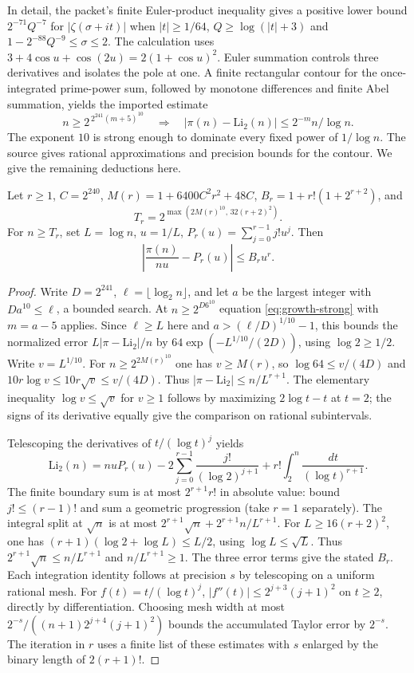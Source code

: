 In detail, the packet's finite Euler-product inequality gives a positive lower bound $2^{-71}Q^{-7}$ for $|\zeta(\sigma+it)|$ when $|t|\ge1/64$, $Q\ge\log(|t|+3)$ and $1-2^{-88}Q^{-9}\le\sigma\le2$. The calculation uses $3+4\cos u+\cos(2u)=2(1+\cos u)^2$. Euler summation controls three derivatives and isolates the pole at one. A finite rectangular contour for the once-integrated prime-power sum, followed by monotone differences and finite Abel summation, yields the imported estimate
\begin{equation}\label{eq:growth-strong}
 n\ge 2^{\,2^{241}(m+5)^{10}}
 \quad\Longrightarrow\quad
 |\pi(n)-\mathrm{Li}_2(n)|\le 2^{-m} n/\log n .
\end{equation}
The exponent $10$ is strong enough to dominate every fixed power of $1/\log n$. The source gives rational approximations and precision bounds for the contour. We give the remaining deductions here.

\begin{lemma}\label{lem:growthfactorial}
Let $r\ge1$, $C=2^{240}$, $M(r)=1+6400C^2r^2+48C$, $B_r=1+r!(1+2^{r+2})$, and
\[
 T_r=2^{\max(2M(r)^{10},\,32(r+2)^2)}.
\]
For $n\ge T_r$, set $L=\log n$, $u=1/L$, $P_r(u)=\sum_{j=0}^{r-1}j!u^j$. Then
\[
 \left|\frac{\pi(n)}{nu}-P_r(u)\right|\le B_r u^r.
\]
\end{lemma}
\begin{proof}
Write $D=2^{241}$, $\ell=\lfloor\log_2 n\rfloor$, and let $a$ be the largest integer with $D a^{10}\le\ell$, a bounded search. At $n\ge2^{D6^{10}}$ equation \eqref{eq:growth-strong} with $m=a-5$ applies. Since $\ell\ge L$ here and $a>(\ell/D)^{1/10}-1$, this bounds the normalized error $L|\pi-\mathrm{Li}_2|/n$ by $64\exp(-L^{1/10}/(2D))$, using $\log2\ge1/2$. Write $v=L^{1/10}$. For $n\ge2^{2M(r)^{10}}$ one has $v\ge M(r)$, so $\log64\le v/(4D)$ and $10r\log v\le10r\sqrt v\le v/(4D)$. Thus $|\pi-\mathrm{Li}_2|\le n/L^{r+1}$. The elementary inequality $\log v\le\sqrt v$ for $v\ge1$ follows by maximizing $2\log t-t$ at $t=2$; the signs of its derivative equally give the comparison on rational subintervals.

Telescoping the derivatives of $t/(\log t)^j$ yields
\[
 \mathrm{Li}_2(n)=nuP_r(u)
 -2\sum_{j=0}^{r-1}\frac{j!}{(\log2)^{j+1}}
 +r!\int_2^n\frac{dt}{(\log t)^{r+1}} .
\]
The finite boundary sum is at most $2^{r+1}r!$ in absolute value: bound $j!\le(r-1)!$ and sum a geometric progression (take $r=1$ separately). The integral split at $\sqrt n$ is at most $2^{r+1}\sqrt n+2^{r+1}n/L^{r+1}$. For $L\ge16(r+2)^2$, one has $(r+1)(\log2+\log L)\le L/2$, using $\log L\le\sqrt L$. Thus $2^{r+1}\sqrt n\le n/L^{r+1}$ and $n/L^{r+1}\ge1$. The three error terms give the stated $B_r$. Each integration identity follows at precision $s$ by telescoping on a uniform rational mesh. For $f(t)=t/(\log t)^j$, $|f''(t)|\le 2^{j+3}(j+1)^2$ on $t\ge2$, directly by differentiation. Choosing mesh width at most $2^{-s}/((n+1)2^{j+4}(j+1)^2)$ bounds the accumulated Taylor error by $2^{-s}$. The iteration in $r$ uses a finite list of these estimates with $s$ enlarged by the binary length of $2(r+1)!$.
\end{proof}

